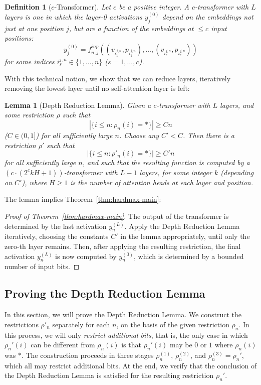 \documentclass[11pt,a4paper]{article}
\newcounter{theorem}
\newtheorem{defin}[theorem]{Definition}
\newtheorem{lemma}[theorem]{Lemma}
\begin{document}
\begin{defin}[$c$-Transformer]
Let $c$ be a positive integer. A $c$-transformer with $L$ layers is one in which the layer-0 activations $y_j^{(0)}$ depend on the embeddings not just at one position $j$, but are a function of the embeddings at $\leq c$ input positions:
\begin{equation}
    y_j^{(0)} = f^{inp}_{n,j}((v_{i_1^{j,n}}, p_{i_1^{j,n}}), \dots, (v_{i_c^{j,n}}, p_{i_c^{j,n}} ))
\end{equation}
for some indices ${i_s^{j,n}} \in \{1, \dots, n\}$ ($s = 1, \dots, c$).
\end{defin}


With this technical notion, we show that we can reduce layers, iteratively removing the lowest layer until no self-attention layer is left:

\begin{lemma}[Depth Reduction Lemma]\label{lemma:depth-red}
Given a $c$-transformer with $L$ layers, and some restriction $\rho$ such that
\begin{equation}
|\{i \leq n: \rho_n(i) = *\}| \geq Cn
\end{equation}
($C \in (0,1]$)
for all sufficiently large $n$.
Choose any $C' < C$.
Then there is a restriction $\rho'$ 
such that
\begin{equation}
|\{i \leq n: \rho'_n(i) = *\}| \geq C'n
\end{equation}
for all sufficiently large $n$, 
and such that the resulting function is computed by a $( c\cdot(2^ckH+1))$-transformer with $L-1$ layers, for some integer $k$ (depending on $C'$), where $H \geq 1$ is the number of attention heads at each layer and position.
\end{lemma}
The lemma implies Theorem~\ref{thm:hardmax-main}:
\begin{proof}[Proof of Theorem~\ref{thm:hardmax-main}]
The output of the transformer is determined by the last activation $y_{n}^{(L)}$.
Apply the Depth Reduction Lemma iteratively, choosing the constants $C'$ in the lemma appropriately, until only the zero-th layer remains.
Then, after applying the resulting restriction, the final activation $y_{n}^{(L)}$ is now computed by $y_{n}^{(0)}$, which is determined by a bounded number of input bits.
\end{proof}



\subsection{Proving the Depth Reduction Lemma}
In this section, we will prove the Depth Reduction Lemma.
We construct the restrictions $\rho'_n$ separately for each $n$, on the basis of the given restriction $\rho_n$.
In this process, we will only \emph{restrict additional bits}, that is, the only case in which $\rho_n'(i)$ can be different from $\rho_n(i)$ is that $\rho_n'(i)$ may be $0$ or $1$ where $\rho_n(i)$ was $*$.
The construction proceeds in three stages $\rho_n^{(1)}$, $\rho_n^{(2)}$, and $\rho_n^{(3)} = \rho_n'$, which all may restrict additional bits.
At the end, we verify that the conclusion of the Depth Reduction Lemma is satisfied for the resulting restriction $\rho_n'$.
\end{document}
